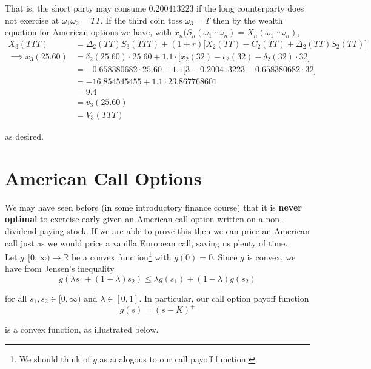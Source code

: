 \documentclass[12pt]{article}
\newlength\tindent
\renewcommand{\indent}{\hspace*{\tindent}}
\newcommand{\R}{\mathbb R}
\begin{document}
\begin{enumerate}[(a)]
	That is, the short party may consume $0.200413223$ if the long counterparty does not exercise at $\omega_1\omega_2 = TT$. If the third coin toss $\omega_3 = T$ then by the wealth equation for American options we have, with $x_n(S_n(\omega_1\cdots\omega_n) = X_n(\omega_1\cdots\omega_n)$,
	\begin{align*}
		X_3(TTT) &= \Delta_2(TT)S_3(TTT) + (1 + r) \Big[ X_2(TT) - C_2(TT) + \Delta_2(TT)S_2(TT) \Big] \\
		\implies x_3(25.60) &= \delta_2(25.60)\cdot25.60 + 1.1\cdot\Big[ x_2(32) - c_2(32) - \delta_2(32)\cdot 32 \Big] \\
		&= -0.658380682\cdot25.60 + 1.1\Big[3 - 0.200413223 + 0.658380682\cdot 32 ] \\
		&= -16.854545455 + 1.1 \cdot 23.867768601 \\
		&= 9.4 \\
		&= v_3(25.60) \\
		&= V_3(TTT)
	\end{align*}
	
	as desired.	
\end{enumerate}

\section{American Call Options}

\indent We may have seen before (in some introductory finance course) that it is {\bf never optimal} to exercise early given an American call option written on a non-dividend paying stock. If we are able to prove this then we can price an American call just as we would price a vanilla European call, saving us plenty of time. \\

Let $g:[0,\infty)\to\R$ be a convex function\footnote{We should think of $g$ as analogous to our call payoff function.} with $g(0) = 0$. Since $g$ is convex, we have from Jensen's inequality
\begin{equation*}
	g(\lambda s_1 + (1 - \lambda)s_2) \leq \lambda g(s_1) + (1 - \lambda)g(s_2)
\end{equation*}

for all $s_1,s_2 \in [0,\infty)$ and $\lambda \in [0,1]$. In particular, our call option payoff function
\begin{equation*}
	g(s) = (s - K)^+
\end{equation*}

is a convex function, as illustrated below.
\end{document}
